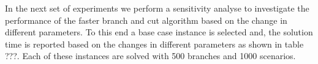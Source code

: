\documentclass[10pt]{article}
\begin{document}
In the next set of experiments we perform a sensitivity analyse to investigate the performance of the faster branch and cut algorithm based on the change in different parameters. To this end a base case instance is selected and, the solution time is reported based on the changes in different parameters as shown in table ???. 
Each of these instances are solved with 500 branches and 1000 scenarios. 

\begin{comment}

\begin{table}[]
\caption{Comparison of methodology to solve the model with the service level}
\label{tab:MethodologyCompare}
\begin{tabular}{lllllllllllll}
Method      & \multicolumn{4}{c}{Extensive form} & \multicolumn{4}{c}{Strong Cut}    & \multicolumn{4}{c}{Fast Cut}     \\ \hline
\# Branches & Time    & Gap   & \# Opt & BestObj & Time   & Gap   & \# Opt & BestObj & Time  & Gap   & \# Opt & BestObj \\ \hline
100         & 800.2   & 0.2\% & 4.8    & 10612.1 & 9.3    & 0.0\% & 5.0    & 10611.7 & 3.2   & 0.0\% & 5.0    & 10611.7 \\
200         & 2110.8  & 1.4\% & 4.1    & 10513.3 & 45.4   & 0.0\% & 5.0    & 10509.0 & 7.4   & 0.0\% & 5.0    & 10509.0 \\
300         & 3264.9  & 2.5\% & 3.2    & 10419.6 & 131.2  & 0.0\% & 5.0    & 10407.5 & 10.3  & 0.0\% & 5.0    & 10407.5 \\
500         & 4061.1  & 3.8\% & 2.5    & 10752.6 & 582.7  & 0.0\% & 5.0    & 10712.6 & 25.9  & 0.0\% & 5.0    & 10712.6 \\
1000        & 5321.6  & 7.5\% & 1.6    & 12369.2 & 3265.4 & 1.1\% & 4.0    & 10722.1 & 220.3 & 0.0\% & 4.9    & 10700.5 \\ \hline
Average     & 3111.7  & 3.1\% & 3.2    & 10933.4 & 806.8  & 0.2\% & 4.8    & 10592.6 & 53.4  & 0.0\% & 5.0    & 10588.3
\end{tabular}


\end{table}
\end{comment}
\end{document}
